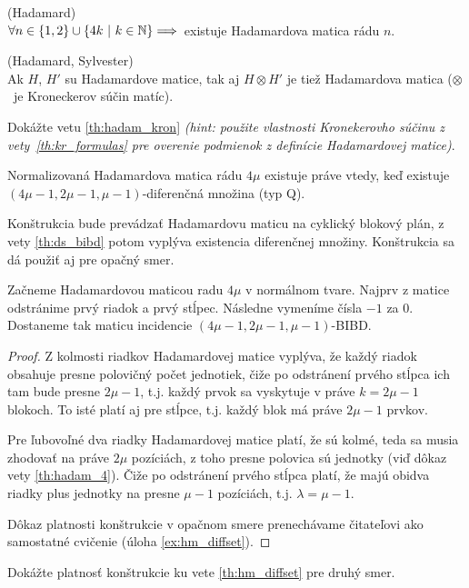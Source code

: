 \begin{hypothesis}{(Hadamard)}\\
$\forall n \in \left\{1, 2\right\} \cup \left\{4k ~|~ k \in \mathbb{N}\right\} \Longrightarrow$~existuje Hadamardova matica rádu $n$. 
\end{hypothesis}


\begin{theorem}{(Hadamard, Sylvester)}\\
\label{th:hadam_kron}
Ak $H$, $H'$ su Hadamardove matice, tak aj $H \otimes H'$ je tiež Hadamardova matica ($\otimes$~je Kroneckerov súčin matíc).
\end{theorem}

\begin{toreview}
\begin{exercise}
Dokážte vetu \ref{th:hadam_kron} \emph{(hint: použite vlastnosti Kronekerovho súčinu z vety~\ref{th:kr_formulas} pre overenie podmienok z definície Hadamardovej matice)}.
\end{exercise}
\end{toreview}

\begin{theorem}
\label{th:hm_diffset}
Normalizovaná Hadamardova matica rádu $4\mu$ existuje práve vtedy, keď existuje $(4\mu-1, 2\mu-1, \mu-1)$-diferenčná množina (typ Q). 
\end{theorem}

\begin{toreview}
\begin{construction}
Konštrukcia bude prevádzať Hadamardovu maticu na cyklický blokový plán, z vety \ref{th:ds_bibd} potom vyplýva existencia diferenčnej množiny. Konštrukcia sa dá použiť aj pre opačný smer.

Začneme Hadamardovou maticou radu $4\mu$ v normálnom tvare. 
Najprv z matice odstránime prvý riadok a prvý stĺpec.
Následne vymeníme čísla $-1$ za $0$.
Dostaneme tak maticu incidencie $(4\mu - 1, 2\mu - 1, \mu -1)$-BIBD.
\end{construction}
\begin{proof}
Z kolmosti riadkov Hadamardovej matice vyplýva, že každý riadok obsahuje presne polovičný počet jednotiek, čiže po odstránení prvého stĺpca ich tam bude presne $2\mu - 1$, t.j. každý prvok sa vyskytuje v práve $k = 2\mu - 1$ blokoch. To isté platí aj pre stĺpce, t.j. každý blok má práve $2\mu - 1$ prvkov.

Pre ľubovoľné dva riadky Hadamardovej matice platí, že sú kolmé, teda sa musia zhodovať na práve $2\mu$ pozíciách, z toho presne polovica sú jednotky (viď dôkaz vety \ref{th:hadam_4}). Čiže po odstránení prvého stĺpca platí, že majú obidva riadky plus jednotky na presne $\mu - 1$ pozíciách, t.j. $\lambda = \mu - 1$.

Dôkaz platnosti konštrukcie v opačnom smere prenechávame čitateľovi ako samostatné cvičenie (úloha \ref{ex:hm_diffset}).
\end{proof}

\begin{exercise}
\label{ex:hm_diffset}
Dokážte platnosť konštrukcie ku vete \ref{th:hm_diffset} pre druhý smer. 
\end{exercise}
\end{toreview}

